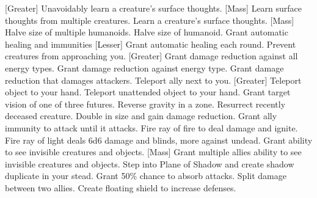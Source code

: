 [Greater]
    {Unavoidably learn a creature's surface thoughts.}
[Mass]
    {Learn surface thoughts from multiple creatures.}
    {Learn a creature's surface thoughts.}
[Mass]
    {Halve size of multiple humanoids.}
    {Halve size of humanoid.}
    {Grant automatic healing and immunities}
[Lesser]
    {Grant automatic healing each round.}
    {Prevent creatures from approaching you.}
[Greater]
    {Grant damage reduction against all energy types.}
    {Grant damage reduction against energy type.}
    {Grant damage reduction that damages attackers.}
    {Teleport ally next to you.}
[Greater]
    {Teleport object to your hand.}
    {Teleport unattended object to your hand.}
    {Grant target vision of one of three futures.}
    {Reverse gravity in a zone.}
    {Resurrect recently deceased creature.}
    {Double in size and gain damage reduction.}
    {Grant ally immunity to attack until it attacks.}
    {Fire ray of fire to deal damage and ignite.}
    {Fire ray of light deals 6d6 damage and blinds, more against undead.}
    {Grant ability to see invisible creatures and objects.}
[Mass]
    {Grant multiple allies ability to see invisible creatures and objects.}
    {Step into Plane of Shadow and create shadow duplicate in your stead.}
    {Grant 50\% chance to absorb attacks.}
    {Split damage between two allies.}
    {Create floating shield to increase defenses.}
